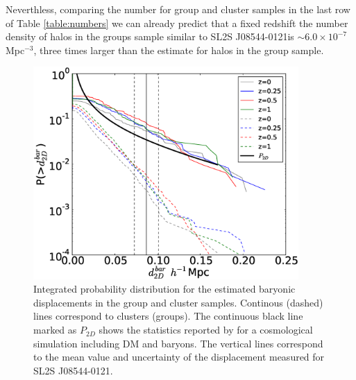 \documentclass{emulateapj}
\newcommand{\bullg}{SL2S J08544-0121}
\begin{document}
Neverthless, comparing the number for group and cluster samples in the
last row of Table \ref{table:numbers} we can already predict that a
fixed redshift the number density of halos in the groups sample similar to \bullg is
$\sim 6.0\times 10^{-7}$ Mpc$^{-3}$, three times larger than the
estimate for halos in the group sample.




\begin{figure}
\begin{center}
\includegraphics[width=0.9\textwidth]{figure_3.eps}
\end{center}
\caption{Integrated probability distribution for the estimated
  baryonic displacements in the group and cluster samples. Continous (dashed)
  lines correspond to clusters (groups). The continuous black line
  marked as $P_{2D}$ shows the statistics reported by
  \citet{ForeroRomero2010} for a cosmological simulation including DM
  and baryons. The vertical lines correspond to the mean value and
  uncertainty of the displacement measured for \bullg.} 
\label{fig:baryonic_displacements}
\end{figure}
\end{document}
